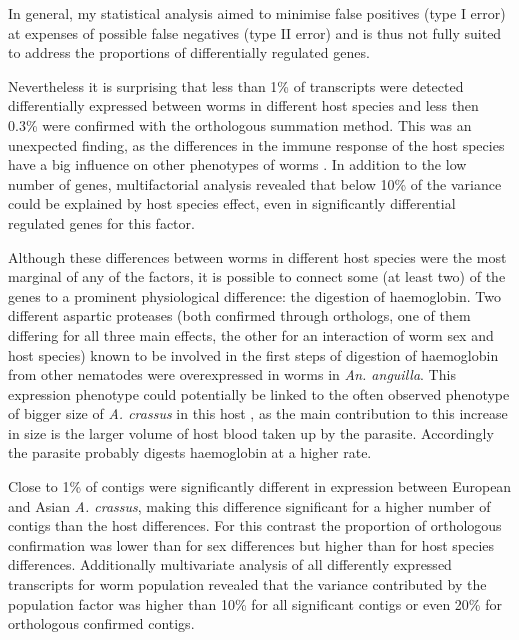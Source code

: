 In general, my statistical analysis aimed to minimise false positives
(type I error) at expenses of possible false negatives (type II error)
and is thus not fully suited to address the proportions of
differentially regulated genes.

Nevertheless it is surprising that less than 1\% of transcripts were
detected differentially expressed between worms in different host
species and less then 0.3\% were confirmed with the orthologous
summation method. This was an unexpected finding, as the differences
in the immune response of the host species have a big influence on
other phenotypes of worms \cite{knopf_swimbladder_2006}. In addition
to the low number of genes, multifactorial analysis revealed that
below 10\% of the variance could be explained by host species effect,
even in significantly differential regulated genes for this factor.

Although these differences between worms in different host species
were the most marginal of any of the factors, it is possible to
connect some (at least two) of the genes to a prominent physiological
difference: the digestion of haemoglobin. Two different aspartic
proteases (both confirmed through orthologs, one of them differing for
all three main effects, the other for an interaction of worm sex and
host species) known to be involved in the first steps of digestion of
haemoglobin from other nematodes \cite{pmid12782060} were
overexpressed in worms in \textit{An. anguilla}. This expression
phenotype could potentially be linked to the often observed phenotype
of bigger size of \textit{A. crassus} in this host
\cite{knopf_swimbladder_2006}, as the main contribution to this
increase in size is the larger volume of host blood taken up by the
parasite. Accordingly the parasite probably digests haemoglobin at a
higher rate.

Close to 1\% of contigs were significantly different in expression
between European and Asian \textit{A. crassus}, making this difference
significant for a higher number of contigs than the host
differences. For this contrast the proportion of orthologous
confirmation was lower than for sex differences but higher than for
host species differences. Additionally multivariate analysis of all
differently expressed transcripts for worm population revealed that
the variance contributed by the population factor was higher than 10\%
for all significant contigs or even 20\% for orthologous confirmed
contigs.

